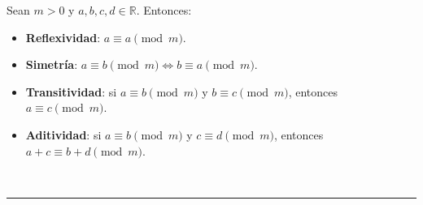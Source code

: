 \columnbreak
\begin{f}
	
	Sean \(m > 0\) y \(a, b, c, d \in \mathbb{R}\). Entonces:
	
	\begin{itemize}
		\item \textbf{Reflexividad}: \(a \equiv a \pmod{m}\).
		\item \textbf{Simetría}: \(a \equiv b \pmod{m} \iff b \equiv a \pmod{m}\).
		\item \textbf{Transitividad}: si \(a \equiv b \pmod{m}\) y \(b \equiv c \pmod{m}\), entonces \(a \equiv c \pmod{m}\).
		\item \textbf{Aditividad}: si \(a \equiv b \pmod{m}\) y \(c \equiv d \pmod{m}\), entonces \(a + c \equiv b + d \pmod{m}\).
	\end{itemize}
	
\end{f}    \
\
\hrule\
